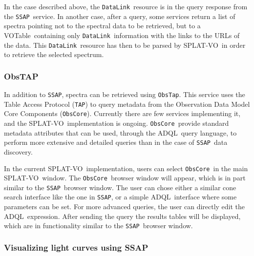 \documentclass[final,authoryear,5p,times,twocolumn]{elsarticle}
\newcommand{\datalink}{\texttt{DataLink}}
\newcommand{\ssap}{\texttt{SSAP}}
\newcommand{\obstap}{\texttt{ObsTap}}
\newcommand{\tap}{\texttt{TAP}}
\newcommand{\obscore}{\texttt{ObsCore}}
\newcommand{\votable}{VOTable}
\newcommand{\adql}{ADQL}
\newcommand{\splatvo}{{\textsf{\small{SPLAT-VO}}}}
\begin{document}
In the case described above, the \datalink\ resource is in the query
response from the \ssap\ service. In another case, after a query, some
services return a list of spectra pointing not to the spectral data to
be retrieved, but to a \votable\ containing only \datalink\ information
with the links to the URLs of the data. This \datalink\ resource has
then to be parsed by \splatvo\ in order to retrieve the selected spectrum.

\subsubsection{ObsTAP}

In addition to \ssap, spectra can be retrieved using \obstap. This service uses
the Table Access Protocol (\tap) to query metadata from the Observation
Data Model Core Components (\obscore). Currently there are few services
implementing it, and the \splatvo\ implementation is ongoing.  \obscore\
provide standard metadata attributes that can be used, through the
\adql\ query language, to perform more extensive and detailed queries
than in the case of \ssap\ data discovery.

In the current \splatvo\ implementation, users can select \obscore\ in the
main \splatvo\ window. The \obscore\ browser window will appear, which is in
part similar to the \ssap\ browser window. The user can chose either a
similar cone search interface like the one in \ssap, or a
simple \adql\ interface where some parameters can be set. For more
advanced queries, the user can directly edit the \adql\
expression. After sending the query the results tables will be
displayed, which are in functionality similar to the \ssap\ browser
window.

\subsubsection{Visualizing light curves using SSAP}

\end{document}

